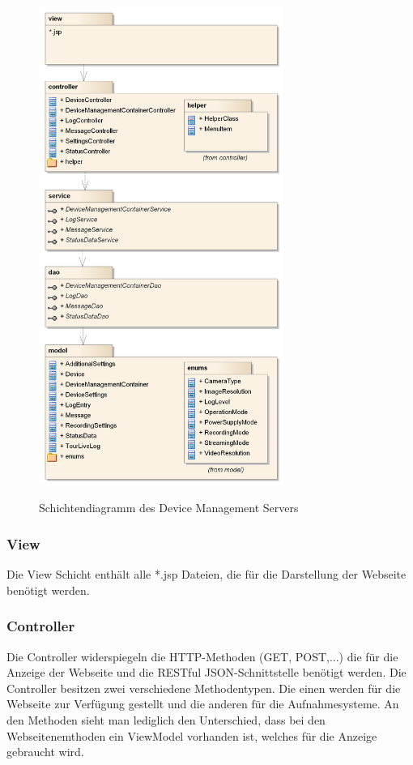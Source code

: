 \begin{figure}[H]
	\centering
	\includegraphics[width=80mm]{images/devmgmtsrv/schichten.jpg}
	\label{fig:devmgmtsrvschichten}
	\caption{Schichtendiagramm des Device Management Servers}
\end{figure}

\subsubsection{View}
Die View Schicht enthält alle *.jsp Dateien, die für die Darstellung der Webseite benötigt werden. 

\subsubsection{Controller}
Die Controller widerspiegeln die HTTP-Methoden (GET, POST,...) die für die Anzeige der Webseite und die RESTful JSON-Schnittstelle benötigt werden. Die Controller besitzen zwei verschiedene Methodentypen. Die einen werden für die Webseite zur Verfügung gestellt und die anderen für die Aufnahmesysteme. An den Methoden sieht man lediglich den Unterschied, dass bei den Webseitenemthoden ein ViewModel vorhanden ist, welches für die Anzeige gebraucht wird.

